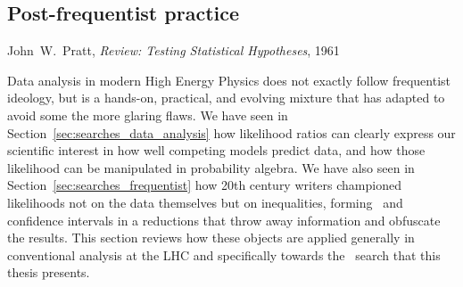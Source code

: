 \begin{singlespacing}
\section{Post-frequentist practice}
\label{sec:searches_practice}
\begin{epigraphs}
%
{John~W.~Pratt,
\textit{Review: Testing Statistical Hypotheses},
1961~\cite{pratt1961testing}}
\end{epigraphs}
\end{singlespacing}

Data analysis in modern High Energy Physics does not exactly follow frequentist
ideology, but is a hands-on, practical, and evolving mixture that has adapted
to avoid some the more glaring flaws.
We have seen in Section~\ref{sec:searches_data_analysis} how likelihood ratios
can clearly express our scientific interest in how well competing models
predict data, and how those likelihood can be manipulated in probability
algebra.
We have also seen in Section~\ref{sec:searches_frequentist} how 20th century
writers championed likelihoods not on the data themselves but on inequalities,
forming \pvalues\ and confidence intervals in a reductions that throw away
information and obfuscate the results.
This section reviews how these objects are applied generally in conventional
analysis at the LHC and specifically towards the \atlas\ search that this
thesis presents.

